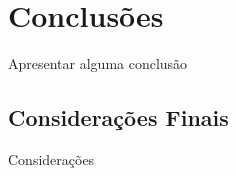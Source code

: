 \chapter{Conclusões}
\label{cap:conclusoes}

Apresentar alguma conclusão

\section{Considerações Finais} 

Considerações

